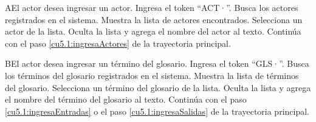  \begin{UCtrayectoriaA}{A}{El actor desea ingresar un actor.}
 	\UCpaso[\UCactor] Ingresa el token ``ACT·''.
 	\UCpaso[\UCsist] Busca los actores registrados en el sistema. 
 	\UCpaso[\UCsist] Muestra la lista de actores encontrados.
 	\UCpaso[\UCactor] Selecciona un actor de la lista.
  	\UCpaso[\UCsist] Oculta la lista y agrega el nombre del actor al texto.
    \UCpaso[] Continúa con el paso \ref{cu5.1:ingresaActores} de la trayectoria principal.
 \end{UCtrayectoriaA}
 \begin{UCtrayectoriaA}{B}{El actor desea ingresar un término del glosario.}
 	\UCpaso[\UCactor] Ingresa el token ``GLS·''.	
 	\UCpaso[\UCsist] Busca los términos del glosario registrados en el sistema. 
 	\UCpaso[\UCsist] Muestra la lista de términos del glosario.
 	\UCpaso[\UCactor] Selecciona un término del glosario de la lista.
  	\UCpaso[\UCsist] Oculta la lista y agrega el nombre del término del glosario al texto.
    \UCpaso[] Continúa con el paso \ref{cu5.1:ingresaEntradas} o el paso \ref{cu5.1:ingresaSalidas} de la trayectoria principal.
 \end{UCtrayectoriaA}

